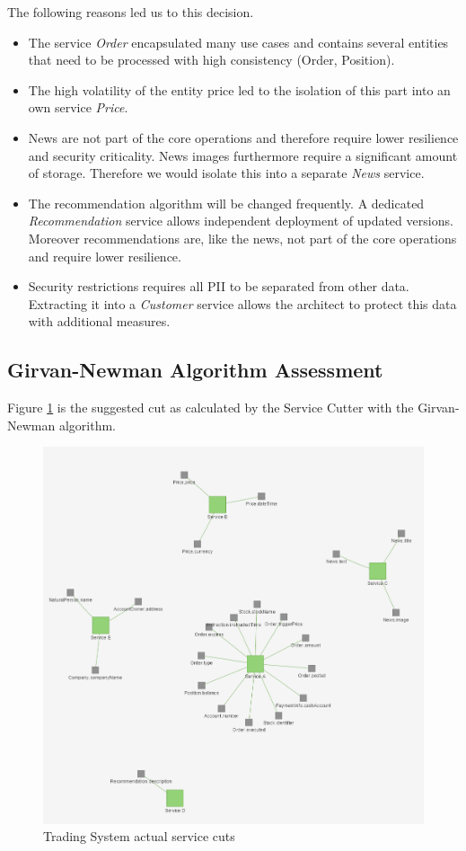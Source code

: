 The following reasons led us to this decision.
\begin{itemize}
	\item The service \textit{Order} encapsulated many use cases and contains several entities that need to be processed with high consistency (Order, Position).
	\item The high volatility of the entity price led to the isolation of this part into an own service \textit{Price}.
	\item News are not part of the core operations and therefore require lower resilience and security criticality. News images furthermore require a significant amount of storage. Therefore we would isolate this into a separate \textit{News} service.
	\item The recommendation algorithm will be changed frequently. A dedicated \textit{Recommendation} service allows independent deployment of updated versions. Moreover recommendations are, like the news, not part of the core operations and require lower resilience. 
	\item Security restrictions requires all \gls{PII} to be separated from other data. Extracting it into a \textit{Customer} service allows the architect to protect this data with additional measures. 
\end{itemize}


\subsection{Girvan-Newman Algorithm Assessment}

Figure \ref{fig:tradingCutsTool} is the suggested cut as calculated by the Service Cutter with the Girvan-Newman algorithm. 

\begin{figure}[H]
	\includegraphics[scale=0.5]{images/trading_service_cut.png}
	\caption{Trading System actual service cuts}
	\label{fig:tradingCutsTool}
\end{figure}

